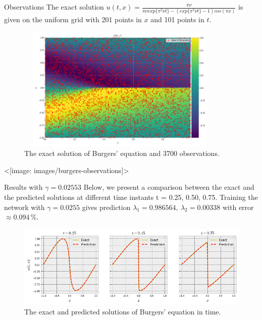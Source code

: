 \documentclass{beamer}
\def\texttt#1{<#1>}%
\begin{document}
\begin{frame}{Observations}
\small
The exact solution $u(t, x) = \frac{\pi \nu}{\pi \nu exp{\{\pi^2 \nu t\}} - (exp{\{\pi^2 \nu t\}} - 1) cos(\pi x)}$ is given on the uniform grid with 201 points in $x$ and 101 points in $t$. 
\begin{figure}
    \centering
    \includegraphics[width=10cm, height=6cm]{02-presentation-v1/images/burgers-exact.png}
    \caption{The exact solution of Burgers' equation and 3700 observations.}
    \label{fig:my_label}
\end{figure}

\centering
\texttt{[image: images/burgers-observations]}
\end{frame}

\begin{frame}{Results with $\gamma=0.02553$}
Below, we present a comparison between the exact and the predicted solutions at different time instants t = 0.25, 0.50, 0.75. Training the network with $\gamma=0.0255$ gives prediction $\lambda_1 =
0.986564, ~ \lambda_2 = 0.00338$ with error $\approx 0.094 \,\%$.

\begin{figure}
    \centering
    \includegraphics[scale=0.43]{02-presentation-v1/images/burgers-exact-predict.png}
    \caption{The exact and predicted solutions of Burgers' equation in time.}
    \label{fig:my_label}
\end{figure}

\end{frame}
\end{document}
